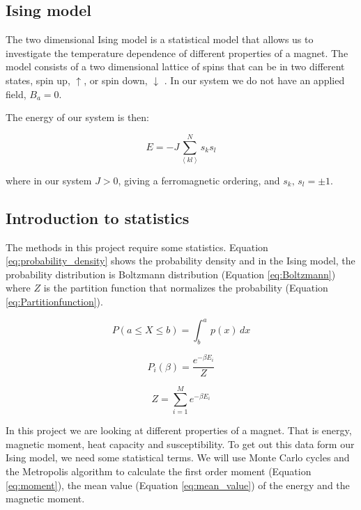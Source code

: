 \subsection{Ising model}

The two dimensional Ising model is a statistical model that allows us to investigate the temperature dependence of different properties of a magnet. The model consists of a two dimensional lattice of spins that can be in two different states, spin up, $\uparrow$, or spin down, $\downarrow$ \cite{Ising}. In our system we do not have an applied field, $B_a = 0$.

The energy of our system is then:

\begin{equation}\label{eq:total_energy}
E = - J \sum^N_{\left< kl \right>} s_k s_l
\end{equation}

where in our system $J > 0$, giving a ferromagnetic ordering, and $s_k, \, s_l = \pm 1$.


\subsection{Introduction to statistics}

The methods in this project require some statistics. Equation \ref{eq:probability_density} shows the probability density and in the Ising model, the probability distribution is Boltzmann distribution (Equation \ref{eq:Boltzmann}) where $Z$ is the partition function that normalizes the probability (Equation \ref{eq:Partitionfunction}).

\begin{equation}\label{eq:probability_density}
P(a\leq X \leq b) = \int_b^a\, p(x)\, dx
\end{equation}

\begin{equation}\label{eq:Boltzmann}
P_i(\beta) = \frac{e^{-\beta E_i}}{Z}
\end{equation}

\begin{equation}\label{eq:Partitionfunction}
Z = \sum_{i=1}^M e^{-\beta E_i}
\end{equation}

In this project we are looking at different properties of a magnet. That is energy, magnetic moment, heat capacity and susceptibility. To get out this data form our Ising model, we need some statistical terms. We will use Monte Carlo cycles and the Metropolis algorithm to calculate the first order moment (Equation \ref{eq:moment}), the mean value (Equation \ref{eq:mean_value}) of the energy and the magnetic moment.

